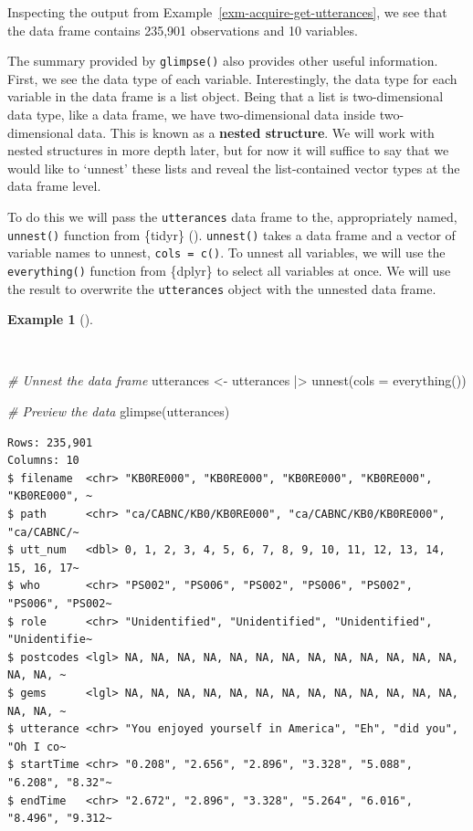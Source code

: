 \documentclass[
  letterpaper,
]{book}
\newenvironment{Shaded}{\begin{snugshade}}{\end{snugshade}}
\newcommand{\AttributeTok}[1]{\textcolor[rgb]{0.00,0.00,0.00}{#1}}
\newcommand{\CommentTok}[1]{\textcolor[rgb]{0.00,0.00,0.00}{\textit{#1}}}
\newcommand{\FunctionTok}[1]{\textcolor[rgb]{0.00,0.00,0.00}{#1}}
\newcommand{\NormalTok}[1]{\textcolor[rgb]{0.00,0.00,0.00}{#1}}
\newcommand{\OtherTok}[1]{\textcolor[rgb]{0.00,0.00,0.00}{#1}}
\newcommand{\SpecialCharTok}[1]{\textcolor[rgb]{0.00,0.00,0.00}{#1}}
\theoremstyle{definition}
\newtheorem{example}{Example}[chapter]
\theoremstyle{remark}
\begin{document}
Inspecting the output from Example~\ref{exm-acquire-get-utterances}, we
see that the data frame contains 235,901 observations and 10 variables.

The summary provided by \texttt{glimpse()} also provides other useful
information. First, we see the data type of each variable.
Interestingly, the data type for each variable in the data frame is a
list object. Being that a list is two-dimensional data type, like a data
frame, we have two-dimensional data inside two-dimensional data. This is
known as a \textbf{nested structure}. We will work with nested
structures in more depth later, but for now it will suffice to say that
we would like to `unnest' these lists and reveal the list-contained
vector types at the data frame level.

To do this we will pass the \texttt{utterances} data frame to the,
appropriately named, \texttt{unnest()} function from \{tidyr\}
().
\texttt{unnest()} takes a data frame and a vector of variable names to
unnest, \texttt{cols\ =\ c()}. To unnest all variables, we will use the
\texttt{everything()} function from \{dplyr\} to select all variables at
once. We will use the result to overwrite the \texttt{utterances} object
with the unnested data frame.

\begin{example}[]\protect\hypertarget{exm-acquire-unnest}{}\label{exm-acquire-unnest}

~

\begin{Shaded}
\begin{Highlighting}[]
\CommentTok{\# Unnest the data frame}
\NormalTok{utterances }\OtherTok{\textless{}{-}}
\NormalTok{  utterances }\SpecialCharTok{|\textgreater{}}
  \FunctionTok{unnest}\NormalTok{(}\AttributeTok{cols =} \FunctionTok{everything}\NormalTok{())}

\CommentTok{\# Preview the data}
\FunctionTok{glimpse}\NormalTok{(utterances)}
\end{Highlighting}
\end{Shaded}

\begin{verbatim}
Rows: 235,901
Columns: 10
$ filename  <chr> "KB0RE000", "KB0RE000", "KB0RE000", "KB0RE000", "KB0RE000", ~
$ path      <chr> "ca/CABNC/KB0/KB0RE000", "ca/CABNC/KB0/KB0RE000", "ca/CABNC/~
$ utt_num   <dbl> 0, 1, 2, 3, 4, 5, 6, 7, 8, 9, 10, 11, 12, 13, 14, 15, 16, 17~
$ who       <chr> "PS002", "PS006", "PS002", "PS006", "PS002", "PS006", "PS002~
$ role      <chr> "Unidentified", "Unidentified", "Unidentified", "Unidentifie~
$ postcodes <lgl> NA, NA, NA, NA, NA, NA, NA, NA, NA, NA, NA, NA, NA, NA, NA, ~
$ gems      <lgl> NA, NA, NA, NA, NA, NA, NA, NA, NA, NA, NA, NA, NA, NA, NA, ~
$ utterance <chr> "You enjoyed yourself in America", "Eh", "did you", "Oh I co~
$ startTime <chr> "0.208", "2.656", "2.896", "3.328", "5.088", "6.208", "8.32"~
$ endTime   <chr> "2.672", "2.896", "3.328", "5.264", "6.016", "8.496", "9.312~
\end{verbatim}

\end{example}
\end{document}
